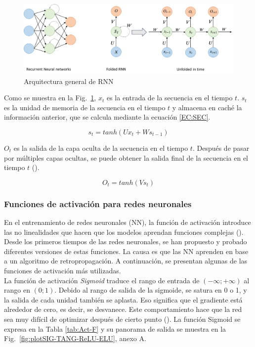 \documentclass[11pt,a4paper,openany]{article}
\begin{document}
        \begin{figure}[H]
            \centering
            \includegraphics[width=10 cm]{RNN.png}
            \caption {Arquitectura general de RNN \label{fig:RNN-A}}
        \end{figure}

        Como se muestra en la Fig.~\ref{fig:RNN-A}, $x_t$ es la entrada de la secuencia en el tiempo $t$. $s_t$ es la unidad de memoria de la secuencia en el tiempo $t$ y almacena en caché la información anterior, que se calcula mediante la ecuación \ref{EC:SEC}.

        \begin{equation}
            s_t= tanh(\textit{U} x_{t}+ \textit{W} s_{t-1})
            \label{EC:SEC}
        \end{equation}

        $O_t$ es la salida de la capa oculta de la secuencia en el tiempo $t$. Después de pasar por múltiples capas ocultas, se puede obtener la salida final de la secuencia en el tiempo $t$ (\cite{Rajaram2018}).

        \begin{equation}
            O_t= tanh(\textit{V} s_{t})
            \label{EC:OUT}
        \end{equation}
        
        
        
        \subsubsection{Funciones de activación para redes neuronales}
        En el entrenamiento de redes neuronales (NN), la función de activación introduce las no linealidades que hacen que los modelos aprendan funciones complejas (\cite{sharma2017}). Desde los primeros tiempos de las redes neuronales, se han propuesto y probado diferentes versiones de estas funciones. La causa es que las NN aprenden en base a un algoritmo de retropropagación. A continuación, se presentan algunas de las funciones de activación más utilizadas.\\

        La función de activación \textit{Sigmoid} traduce el rango de entrada de $(- \infty; + \infty)$ al rango en $(0; 1)$. Debido al rango de salida de la sigmoide, se satura en 0 o 1, y la salida de cada unidad también se aplasta. Eso significa que el gradiente está alrededor de cero, es decir, se desvanece. Este comportamiento hace que la red sea muy difícil de optimizar después de cierto punto (\cite{Szandaa2020}). La función Sigmoid se expresa en la Tabla \ref{tab:Act-F} y su panorama de salida se muestra en la Fig.~\ref{fig:plotSIG-TANG-ReLU-ELU}, anexo A. \\
\end{document}
